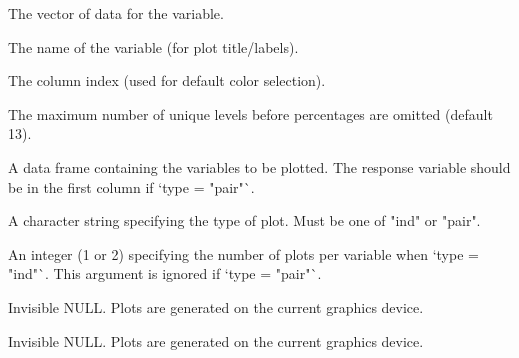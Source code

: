\documentclass[a4paper]{book}
\begin{document}
%
\begin{Arguments}
\begin{ldescription}
\item[\code{x}] The vector of data for the variable.

\item[\code{var\_name}] The name of the variable (for plot title/labels).

\item[\code{col\_idx}] The column index (used for default color selection).

\item[\code{max\_levels}] The maximum number of unique levels before percentages are omitted (default 13).

\item[\code{data}] A data frame containing the variables to be plotted. The response
variable should be in the first column if `type = "pair"`.

\item[\code{type}] A character string specifying the type of plot. Must be one of
"ind" or "pair".

\item[\code{ppv}] An integer (1 or 2) specifying the number of plots per variable
when `type = "ind"`. This argument is ignored if `type = "pair"`.
\end{ldescription}
\end{Arguments}
%
\begin{Value}
Invisible NULL. Plots are generated on the current graphics device.

Invisible NULL. Plots are generated on the current graphics device.
\end{Value}
%
\end{document}
